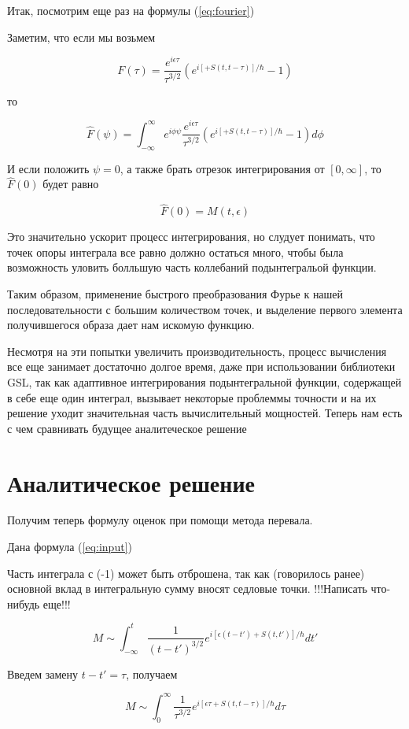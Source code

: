 \documentclass[14pt]{extarticle}
\begin{document}
Итак, посмотрим еще раз на формулы (\ref{eq:fourier})

Заметим, что если мы возьмем 

$$ 
F(\tau) = \frac{e^{i\epsilon \tau}}{{\tau}^{3/2}}(e^{i [+ S(t, t-\tau)]/\hbar} - 1)
$$

то

$$
\hat{F}(\psi) = \int_{-\infty}^{\infty} e^{i \phi \psi} \frac{e^{i\epsilon \tau}}{{\tau}^{3/2}}(e^{i [+ S(t, t-\tau)]/\hbar} - 1) d\phi
$$

И если положить $\psi = 0$, а также брать отрезок интегрирования от $[0, \infty]$, то $\hat{F}(0)$ будет равно

$$
\hat{F}(0) = M(t, \epsilon)
$$

Это значительно ускорит процесс интегрирования, но слудует понимать, что точек опоры интеграла все равно должно остаться много, чтобы была возможность уловить болльшую часть коллебаний подынтегральой функции.

Таким образом, применение быстрого преобразования Фурье к нашей последовательности с большим количеством точек, и выделение первого элемента получившегося образа дает нам искомую функцию.

Несмотря на эти попытки увеличить производительность, процесс вычисления все еще занимает достаточно долгое время, даже при использовании библиотеки GSL, так как адаптивное интегрирования подынтегральной функции, содержащей в себе еще один интеграл, вызывает некоторые проблеммы точности и на их решение уходит значительная часть вычислительный мощностей. 
Теперь нам есть с чем сравнивать будущее аналитеческое решение
%



\section{Аналитическое решение}
Получим теперь формулу оценок при помощи метода перевала.

Дана формула (\ref{eq:input})

Часть интеграла с (-1) может быть отброшена, так как (говорилось ранее) основной вклад в интегральную сумму вносят седловые точки. !!!Написать что-нибудь еще!!!

$$
M \sim \int_{-\infty}^{t} \frac{1}{(t-t')^{3/2}} e^{i[\epsilon (t - t') + S(t, t')]/\hbar} dt'
$$

Введем замену $t - t' = \tau$, получаем

$$
M \sim \int_{0}^{\infty}\frac{1}{{\tau}^{3/2}}e^{i [\epsilon \tau + S(t, t-\tau)]/\hbar} d\tau
$$
\end{document}

